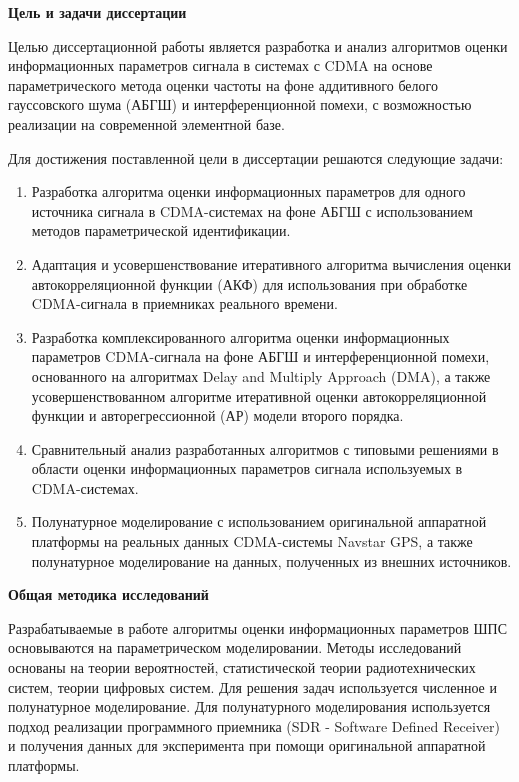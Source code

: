 {\bf{Цель и задачи диссертации}}

Целью диссертационной работы является разработка и анализ алгоритмов оценки информационных параметров сигнала в системах с CDMA на основе
параметрического метода оценки частоты на фоне аддитивного белого гауссовского шума (АБГШ) и интерференционной помехи, с возможностью реализации на современной элементной базе.

Для достижения поставленной цели в диссертации решаются следующие задачи:
\begin{enumerate}
	\item {Разработка алгоритма оценки информационных параметров для одного источника сигнала в CDMA-системах на фоне АБГШ с использованием методов параметрической идентификации.}
	\item {Адаптация и усовершенствование итеративного алгоритма вычисления оценки автокорреляционной функции (АКФ) для использования при обработке CDMA-сигнала в приемниках реального времени.}
	\item {Разработка комплексированного алгоритма оценки информационных параметров CDMA-сигнала на фоне АБГШ и интерференционной помехи, основанного на алгоритмах Delay and Multiply Approach (DMA), а также усовершенствованном алгоритме итеративной оценки автокорреляционной функции и авторегрессионной (АР) модели второго порядка.}
	\item {Сравнительный анализ разработанных алгоритмов с типовыми решениями в области оценки информационных параметров сигнала используемых в CDMA-системах.}
	\item {Полунатурное моделирование с использованием оригинальной аппаратной платформы на реальных данных CDMA-системы Navstar GPS, а также полунатурное моделирование на данных, полученных из внешних источников.}
\end{enumerate}

{\bf{Общая методика исследований}}

Разрабатываемые в работе алгоритмы оценки информационных параметров ШПС основываются на параметрическом моделировании. Методы исследований основаны на теории вероятностей,
статистической теории радиотехнических систем, теории цифровых систем. Для решения задач используется численное и полунатурное моделирование. Для полунатурного моделирования
используется подход реализации программного приемника (SDR - Software Defined Receiver) и получения данных для эксперимента при помощи оригинальной аппаратной платформы.

